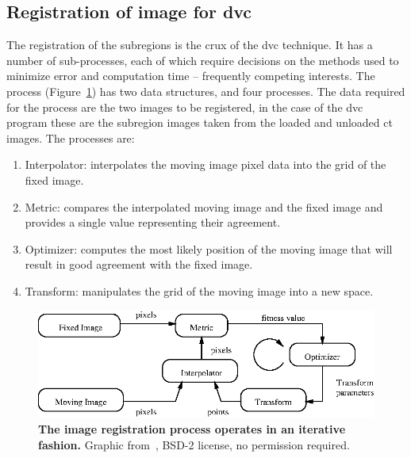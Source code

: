 \subsection{Registration of image for \acs*{dvc}}
\label{sec:dvc_implement_register}
The registration of the subregions is the crux of the \ac{dvc} technique.
It has a number of sub-processes, each of which require decisions on the methods used to minimize error and computation time -- frequently competing interests.
The process (Figure~\ref{fig:Registration}) has two data structures, and four processes.
The data required for the process are the two images to be registered, in the case of the \ac{dvc} program these are the subregion images taken from the loaded and unloaded \ac{ct} images.
The processes are:
\begin{enumerate}
	\item Interpolator: interpolates the moving image pixel data into the grid of the fixed image.
	\item Metric: compares the interpolated moving image and the fixed image and provides a single value representing their agreement.
	\item Optimizer: computes the most likely position of the moving image that will result in good agreement with the fixed image.
	\item Transform: manipulates the grid of the moving image into a new space.
\end{enumerate}

\begin{figure}
\centering
\includegraphics[width=\linewidth]{./appendixDvc/figures/SoftwareGuide-Art-RegistrationComponentsDiagram}
\caption[Image registration process]{\textbf{The image registration process operates in an iterative fashion.} Graphic from~\citet{ibanez_registrationcomponentsdiagram.fig_2003}, BSD-2 license, no permission required.}
\label{fig:Registration}
\end{figure}

